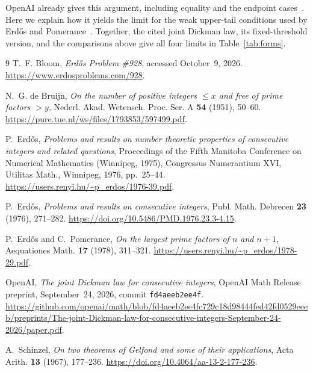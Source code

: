 \documentclass[11pt,a4paper]{amsart}
\begin{document}
OpenAI already gives this argument, including equality and the
endpoint cases~\cite[(11.8) and following paragraph, p.~80]{OpenAI2026}.
Here we explain how it yields the limit for the weak upper-tail
conditions used by Erd\H{o}s and Pomerance~\cite{ErdosPomerance1978}.
Together, the cited joint Dickman law, its fixed-threshold version,
and the comparisons above give all four limits in Table~\ref{tab:forms}.

\begin{thebibliography}{9}
T.~F. Bloom, \emph{Erd\H{o}s Problem \#928},
accessed October~9, 2026.
\newline\url{https://www.erdosproblems.com/928}.

N.~G. de Bruijn, \emph{On the number of positive integers $\le x$ and
free of prime factors $>y$}, Nederl. Akad. Wetensch. Proc. Ser. A
\textbf{54} (1951), 50--60.
\newline\url{https://pure.tue.nl/ws/files/1793853/597499.pdf}.

P.~Erd\H{o}s, \emph{Problems and results on number theoretic properties of
consecutive integers and related questions}, Proceedings of the Fifth
Manitoba Conference on Numerical Mathematics (Winnipeg, 1975), Congressus
Numerantium XVI, Utilitas Math., Winnipeg, 1976, pp.~25--44.
\newline\url{https://users.renyi.hu/~p_erdos/1976-39.pdf}.

P.~Erd\H{o}s, \emph{Problems and results on consecutive integers}, Publ.
Math. Debrecen \textbf{23} (1976), 271--282.
\newline\url{https://doi.org/10.5486/PMD.1976.23.3-4.15}.

P.~Erd\H{o}s and C.~Pomerance, \emph{On the largest prime factors of $n$
and $n+1$}, Aequationes Math. \textbf{17} (1978), 311--321.
\newline\url{https://users.renyi.hu/~p_erdos/1978-29.pdf}.

OpenAI, \emph{The joint Dickman law for consecutive integers}, OpenAI
Math Release preprint, September~24, 2026, commit
\texttt{fd4aeeb2ee4f}.
\newline\url{https://github.com/openai/math/blob/fd4aeeb2ee4fc729c18d98444fed42fd0529eeeb/preprints/The-joint-Dickman-law-for-consecutive-integers-September-24-2026/paper.pdf}.

A.~Schinzel, \emph{On two theorems of Gelfond and some of their
applications}, Acta Arith. \textbf{13} (1967), 177--236.
\newline\url{https://doi.org/10.4064/aa-13-2-177-236}.
\end{thebibliography}
\end{document}
